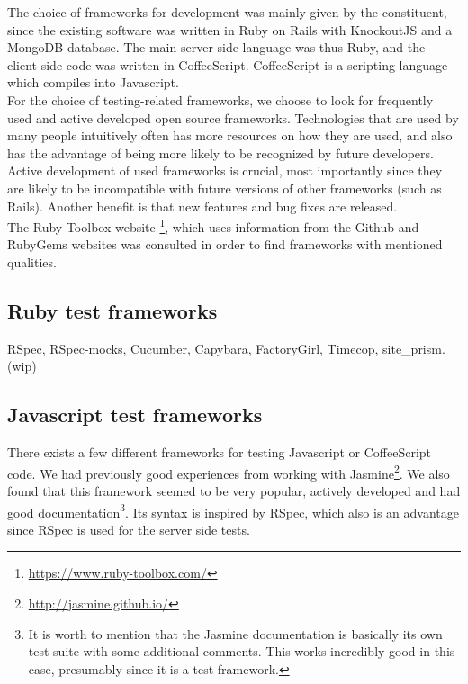 \MakeShortVerb{\|}
\label{sec:choices}

The choice of frameworks for development was mainly given by the
constituent, since the existing software was written in Ruby on Rails
with KnockoutJS and a MongoDB database. The main server-side language
was thus Ruby, and the client-side code was written in CoffeeScript.
CoffeeScript is a scripting language which compiles into Javascript.\\

For the choice of testing-related frameworks, we choose to look for
frequently used and active developed open source frameworks.
Technologies that are used by many people intuitively often has more
resources on how they are used, and also has the advantage of being more
likely to be recognized by future developers. Active development of used
frameworks is crucial, most importantly since they are likely to be
incompatible with future versions of other frameworks (such as Rails).
Another benefit is that new features and bug fixes are released.\\

The Ruby Toolbox website \footnote{\url{https://www.ruby-toolbox.com/}},
which uses information from the Github and RubyGems websites was
consulted in order to find frameworks with mentioned qualities.\\

\subsection{Ruby test frameworks}
RSpec, RSpec-mocks, Cucumber, Capybara, FactoryGirl, Timecop, site\_prism. (wip)


\subsection{Javascript test frameworks}

There exists a few different frameworks for testing Javascript or
CoffeeScript code. We had previously good experiences from working with
Jasmine\footnote{\url{http://jasmine.github.io/}}. We also found that
this framework seemed to be very popular, actively developed and had
good documentation\footnote{It is worth to mention that the Jasmine
documentation is basically its own test suite with some additional
comments. This works incredibly good in this case, presumably since it
is a test framework.}. Its syntax is inspired by RSpec, which also is an
advantage since RSpec is used for the server side tests.\\

